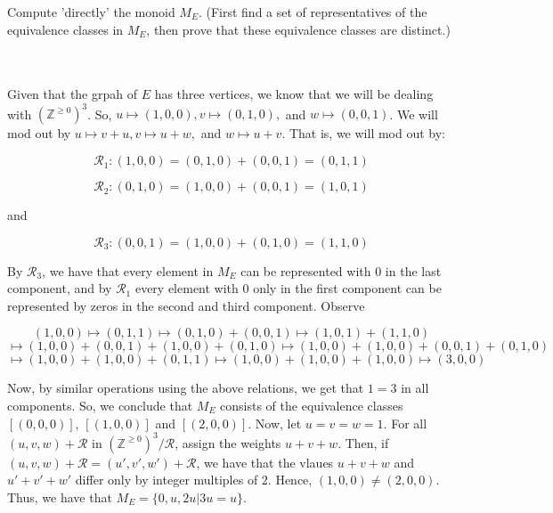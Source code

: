 Compute 'directly' the monoid $M_E$. (First find a set of representatives of the equivalence classes in
$M_E$, then prove that these equivalence classes are distinct.)\\\\

\begin{solution}\renewcommand{\qedsymbol}{}\ \\
    Given that the grpah of $E$ has three vertices, we know that we will be dealing with
    $(\mathbb{Z}^{\geq0})^3$. So, $u\mapsto(1,0,0), v\mapsto(0,1,0),$ and $w\mapsto(0,0,1)$. We will mod
    out by $u\mapsto v+u, v\mapsto u+w,$ and $w\mapsto u+v$. That is, we will mod out by:

    $$\mathcal{R}_1:(1,0,0)=(0,1,0)+(0,0,1)=(0,1,1)$$

    $$\mathcal{R}_2:(0,1,0)=(1,0,0)+(0,0,1)=(1,0,1)$$

    and

    $$\mathcal{R}_3:(0,0,1)=(1,0,0)+(0,1,0)=(1,1,0)$$

    By $\mathcal{R}_3$, we have that every element in $M_E$ can be represented with $0$ in the last
    component, and by $\mathcal{R}_1$ every element with $0$ only in the first component can be
    represented by zeros in the second and third component. Observe

    $$(1,0,0)\mapsto(0,1,1)\mapsto(0,1,0)+(0,0,1)\mapsto(1,0,1)+(1,1,0)$$
    $$\mapsto(1,0,0)+(0,0,1)+(1,0,0)+(0,1,0)\mapsto(1,0,0)+(1,0,0)+(0,0,1)+(0,1,0)$$
    $$\mapsto(1,0,0)+(1,0,0)+(0,1,1)\mapsto(1,0,0)+(1,0,0)+(1,0,0)\mapsto(3,0,0)$$

    Now, by similar operations using the above relations, we get that $1=3$ in all components. So, we
    conclude that $M_E$ consists of the equivalence classes $[(0,0,0)]$, $[(1,0,0)]$ and
    $[(2,0,0)]$. Now, let $u=v=w=1$. For all $(u,v,w)+\mathcal{R}$ in
    $(\mathbb{Z}^{\geq0})^3/\mathcal{R}$, assign the weights $u+v+w$. Then, if
    $(u,v,w)+\mathcal{R}=(u',v',w')+\mathcal{R}$, we have that the vlaues $u+v+w$ and $u'+v'+w'$ differ
    only by integer multiples of $2$. Hence, $(1,0,0)\neq(2,0,0)$. Thus, we have that
    $M_E=\{0,u,2u|3u=u\}$.

\end{solution}